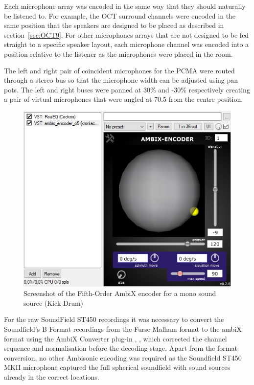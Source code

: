 				Each microphone array was encoded in the same way that they should naturally be listened to. For example, the OCT surround channels were encoded in the same position that the speakers are designed to be placed as described in section~\ref{sec:OCT9}. For other microphones arrays that are not designed to be fed straight to a specific speaker layout, each microphone channel was encoded into a position relative to the listener as the microphones were placed in the room.

				The left and right pair of coincident microphones for the PCMA were routed through a stereo bus so that the microphone width can be adjusted using pan pots. The left and right buses were panned at 30\% and -30\% respectively creating a pair of virtual microphones that were angled at 70.5\textdegree{} from the centre position.

				\begin{figure}[h]
				\begin{center}
					\includegraphics[width = \linewidth]{images/other/ambix.png}
					\caption{Screenshot of the Fifth-Order AmbiX encoder for a mono sound source (Kick Drum)}
					\label{ambixEncode}
				\end{center}
				\end{figure}

				For the raw SoundField ST450 recordings it was necessary to convert the Soundfield's B-Format recordings from the Furse-Malham format to the ambiX format using the AmbiX Converter plug-in \cite{AmbixPLUGINS}, \cite{AmbixDOWNLOAD}, which corrected the channel sequence and normalisation before the decoding stage. Apart from the format conversion, no other Ambisonic encoding was required as the Soundfield ST450 MKII microphone captured the full spherical soundfield with sound sources already in the correct locations. \\

